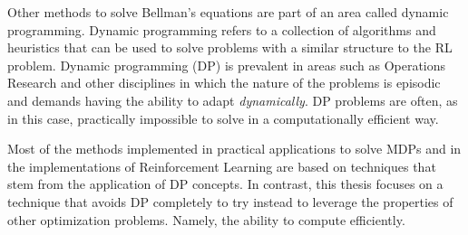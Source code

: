 Other methods to solve Bellman's equations are part of an area called dynamic
programming. Dynamic programming refers to a collection of algorithms and
heuristics that can be used to solve problems with a similar structure to the RL
problem. Dynamic programming (DP) is prevalent in areas such as Operations
Research and other disciplines in which the nature of the problems is episodic
and demands having the ability to adapt \textit{dynamically}. DP problems are
often, as in this case, practically impossible to solve in a computationally
efficient way.

Most of the methods implemented in practical applications to solve MDPs and in
the implementations of Reinforcement Learning are based on techniques that stem
from the application of DP concepts. In contrast, this thesis focuses on a
technique that avoids DP completely to try instead to leverage the properties of
other optimization problems. Namely, the ability to compute efficiently.